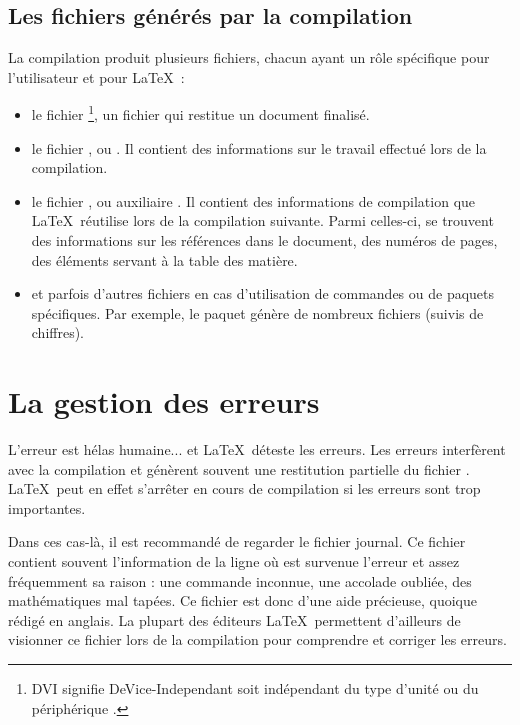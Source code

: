 \subsection{Les fichiers générés par la compilation}

La compilation produit plusieurs fichiers, chacun ayant un rôle spécifique pour l'utilisateur et pour \LaTeX\ :
\begin{itemize}
\item le fichier \footnote{DVI signifie \og DeVice-Independant \fg{} soit \og indépendant du type d'unité ou du périphérique \fg{}.}, un fichier qui restitue un document finalisé.
\item le fichier , ou . Il contient des informations sur le travail effectué lors de la compilation.  
\item le fichier , ou \og auxiliaire \fg{}. Il contient des informations de compilation que \LaTeX\ réutilise lors de la compilation suivante. Parmi celles-ci, se trouvent des informations sur les références dans le document, des numéros de pages, des éléments servant à la table des matière.
\item et parfois d'autres fichiers en cas d'utilisation de commandes ou de paquets spécifiques. Par exemple, le paquet  génère de nombreux fichiers  (suivis de chiffres).
\end{itemize}


\section{La gestion des erreurs}

L'erreur est hélas humaine... et \LaTeX\ déteste les erreurs. Les erreurs interfèrent avec la compilation et génèrent souvent une restitution partielle du fichier . \LaTeX\ peut en effet s'arrêter en cours de compilation si les erreurs sont trop importantes.

Dans ces cas-là, il est recommandé de regarder le fichier journal. Ce fichier contient souvent l'information de la ligne où est survenue l'erreur et assez fréquemment sa raison : une commande inconnue, une accolade oubliée, des mathématiques mal tapées. Ce fichier est donc d'une aide précieuse, quoique rédigé en anglais. La plupart des éditeurs \LaTeX\ permettent d'ailleurs de visionner ce fichier lors de la compilation pour comprendre et corriger les erreurs.

